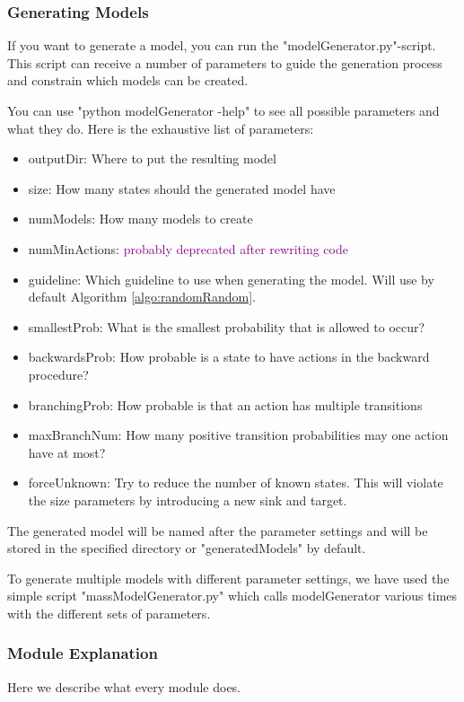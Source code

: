 \subsubsection*{Generating Models}
If you want to generate a model, you can run the "modelGenerator.py"-script.
This script can receive a number of parameters to guide the generation process and constrain which models can be created.

You can use "python modelGenerator -help" to see all possible parameters and what they do.
Here is the exhaustive list of parameters:
\begin{itemize} \label{list:params}
    \item outputDir: Where to put the resulting model
    \item size: How many states should the generated model have
    \item numModels: How many models to create
    \item numMinActions: \textcolor{purple}{probably deprecated after rewriting code}
    \item guideline: Which guideline to use when generating the model. Will use by default Algorithm \ref{algo:randomRandom}.
    \item smallestProb: What is the smallest probability that is allowed to occur?
    \item backwardsProb: How probable is a state to have actions in the backward procedure?
    \item branchingProb: How probable is that an action has multiple transitions
    \item maxBranchNum: How many positive transition probabilities may one action have at most?
    \item forceUnknown: Try to reduce the number of known states. This will violate the size parameters by introducing a new sink and target.
\end{itemize}

The generated model will be named after the parameter settings and will be stored in the specified directory or "generatedModels" by default.

To generate multiple models with different parameter settings, we have used the simple script "massModelGenerator.py" which calls modelGenerator various times with the different sets of parameters.

\subsubsection*{Module Explanation}
Here we describe what every module does.


